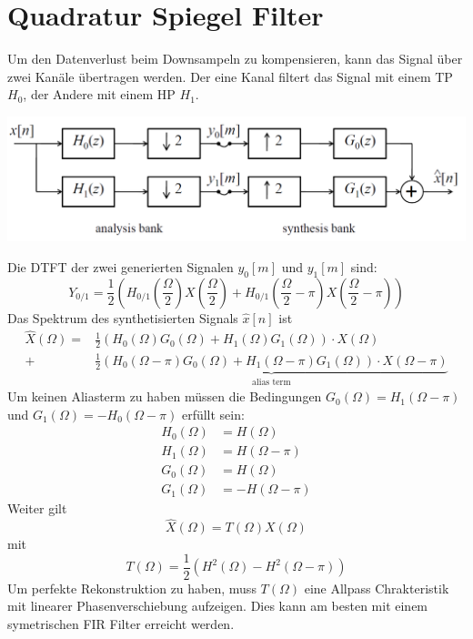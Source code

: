 \section{Quadratur Spiegel Filter}
Um den Datenverlust beim Downsampeln zu kompensieren, kann das Signal über zwei
Kanäle übertragen werden. Der eine Kanal filtert das Signal mit einem TP $H_0$,
der Andere mit einem HP $H_1$.
\begin{center}
	\includegraphics[scale=.7]{./images/quadrature_mirror}
\end{center}
Die DTFT der zwei generierten Signalen $y_0[m]$ und $y_1[m]$ sind:
\[ Y_{0/1} = \frac{1}{2} \left( H_{0/1}\left( \frac{\Omega}{2} \right)
	X\left( \frac{\Omega}{2} \right) + H_{0/1}\left( \frac{\Omega}{2} - \pi
	\right) X\left( \frac{\Omega}{2} -\pi\right) \right)\]
Das Spektrum des synthetisierten Signals $\hat{x}[n]$ ist
\[\begin{aligned} \hat{X}(\Omega) = &\frac12 \left( H_0(\Omega)G_0(\Omega)
	+ H_1(\Omega)G_1(\Omega) \right) \cdot X(\Omega) \\
	+ &\underbrace{\frac12 \left( H_0(\Omega-\pi)G_0(\Omega)
	+ H_1(\Omega-\pi)G_1(\Omega) \right) \cdot X(\Omega-\pi)}_
	{\textrm{alias term}} \end{aligned}\]
Um keinen Aliasterm zu haben müssen die Bedingungen $G_0(\Omega) = H_1(\Omega
-\pi)$ und $G_1(\Omega) = -H_0(\Omega-\pi)$ erfüllt sein:
\[\begin{aligned}
	H_0(\Omega) &= H(\Omega)\\
	H_1(\Omega) &= H(\Omega-\pi)\\
	G_0(\Omega) &= H(\Omega)\\
	G_1(\Omega) &= -H(\Omega-\pi)
\end{aligned}\]
Weiter gilt
\[ \hat{X}(\Omega) = T(\Omega)X(\Omega) \]
mit
\[ T(\Omega) = \frac{1}{2}(H^2(\Omega) -H^2(\Omega-\pi)) \]
Um perfekte Rekonstruktion zu haben, muss $T(\Omega)$ eine Allpass 
Chrakteristik mit linearer Phasenverschiebung aufzeigen. Dies kann am besten
mit einem symetrischen FIR Filter erreicht werden. 
